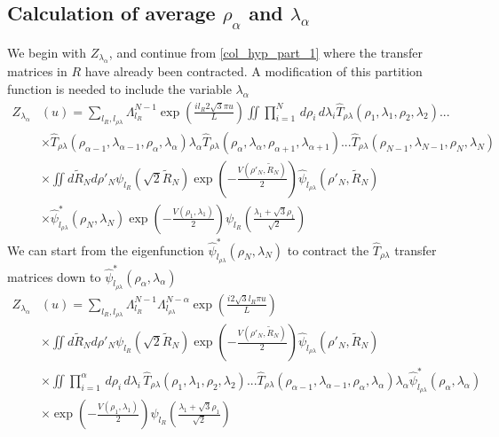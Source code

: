 \subsection{Calculation of average $\rho_{\alpha}$ and $\lambda_{\alpha}$}
%
We begin with $Z_{\lambda_{\alpha}}$, and continue from \eqref{col_hyp_part_1} where the transfer matrices in $R$ have already been contracted. A modification of this partition function is needed to include the variable $\lambda_{\alpha}$
%
\begin{equation}\label{col_hyp_mxd_z_lambda1}
\begin{split}
Z_{\lambda_{\alpha}}&\left(u\right)=\sum_{l_R,l_{\rho\lambda}}\Lambda_{l_{R}}^{N-1}\exp\left(\frac{il_{R} 2\sqrt{3}\pi u}{L}\right)\iint\prod^{N}_{i=1}\,d\rho_i\,d\lambda_i \hat{T}_{\rho\lambda}(\rho_1,\lambda_1,\rho_2,\lambda_2)...\\
&\times\hat{T}_{\rho\lambda}(\rho_{\alpha-1},\lambda_{\alpha-1},\rho_\alpha,\lambda_\alpha) \lambda_{\alpha}\hat{T}_{\rho\lambda}(\rho_\alpha,\lambda_\alpha,\rho_{\alpha+1},\lambda_{\alpha+1})...\hat{T}_{\rho\lambda}(\rho_{N-1},\lambda_{N-1},\rho_N,\lambda_N)\\
&\times\iint d\tilde{R}_N d\rho'_N\psi_{l_R}\left(\sqrt{2}\tilde{R}_N\right)\exp\left(-\frac{V\left(\rho'_{N},\tilde{R}_N\right)}{2}\right)\hat{\psi}_{l_{\rho\lambda}}\left(\rho'_{N},\tilde{R}_N\right)\\
&\times\hat{\psi}^{*}_{l_{\rho\lambda}}\left(\rho_{N},\lambda_{N}\right)\exp\left(-\frac{V\left(\rho_{1},\lambda_{1}\right)}{2}\right)\psi_{l_R}\left(\frac{\lambda_1 + \sqrt{3}\rho_1}{\sqrt{2}}\right)
\end{split}
\end{equation}
%
We can start from the eigenfunction $\hat{\psi}^{*}_{l_{\rho\lambda}}\left(\rho_{N},\lambda_{N}\right)$ to contract the $\hat{T}_{\rho\lambda}$ transfer matrices down to $\hat{\psi}^{*}_{l_{\rho\lambda}}\left(\rho_{\alpha},\lambda_{\alpha}\right)$
%
\begin{align}
\label{col_hyp_mxd_z_lambda2}
Z_{\lambda_{\alpha}}& \left(u\right)=\sum_{l_R,l_{\rho\lambda}}\Lambda_{l_{R}}^{N-1}\Lambda_{l_{\rho\lambda}}^{N-\alpha}\exp\left(\frac{i2\sqrt{3}l_R\pi u}{L}\right)\nonumber\\
&\times\iint d\tilde{R}_N d\rho'_N\psi_{l_R}\left(\sqrt{2}\tilde{R}_N\right)\exp\left(-\frac{V\left(\rho'_{N},\tilde{R}_N\right)}{2}\right)\hat{\psi}_{l_{\rho\lambda}}\left(\rho'_{N},\tilde{R}_N\right)\nonumber\\
&\times\iint\prod^{\alpha}_{i=1}\,d\rho_i\,d\lambda_i\,\hat{T}_{\rho\lambda}(\rho_1,\lambda_1,\rho_2,\lambda_2)...\hat{T}_{\rho\lambda}(\rho_{\alpha-1},\lambda_{\alpha-1},\rho_\alpha,\lambda_\alpha)\lambda_{\alpha}\hat{\psi}^{*}_{l_{\rho\lambda}}\left(\rho_{\alpha},\lambda_{\alpha}\right)\nonumber\\
&\times\exp\left(-\frac{V\left(\rho_{1},\lambda_{1}\right)}{2}\right)\psi_{l_R}\left(\frac{\lambda_1 + \sqrt{3}\rho_1}{\sqrt{2}}\right)
\end{align}
